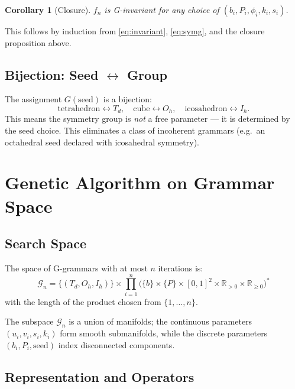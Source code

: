 \documentclass[11pt, a4paper]{article}
\newtheorem{corollary}{Corollary}[section]
\newcommand{\R}{\mathbb{R}}
\newcommand{\Td}{T_d}
\newcommand{\Oh}{O_h}
\newcommand{\Ih}{I_h}
\begin{document}
\begin{corollary}[Closure]
$f_n$ is G-invariant for any choice of $(b_i, P_i, \phi_i, k_i, s_i)$.
\end{corollary}
This follows by induction from \cref{eq:invariant}, \cref{eq:symg}, and the
closure proposition above.

\subsection{Bijection: Seed \texorpdfstring{$\leftrightarrow$}{<->} Group}

The assignment $G(\mathrm{seed})$ is a bijection:
\begin{equation}
  \mathrm{tetrahedron} \leftrightarrow \Td, \quad
  \mathrm{cube} \leftrightarrow \Oh, \quad
  \mathrm{icosahedron} \leftrightarrow \Ih.
\end{equation}
This means the symmetry group is \emph{not} a free parameter — it is
determined by the seed choice. This eliminates a class of incoherent grammars
(e.g.\ an octahedral seed declared with icosahedral symmetry).

\section{Genetic Algorithm on Grammar Space}
\label{sec:ga}

\subsection{Search Space}

The space of G-grammars with at most $n$ iterations is:
\begin{equation}
  \mathcal{G}_n = \{(\Td, \Oh, \Ih)\} \times \prod_{i=1}^{n}
    \bigl(\{b\} \times \{P\} \times [0,1]^2 \times \R_{>0} \times \R_{\geq 0}\bigr)^*
\end{equation}
with the length of the product chosen from $\{1, \ldots, n\}$.

The subspace $\mathcal{G}_n$ is a union of manifolds; the continuous parameters
$(u_i, v_i, s_i, k_i)$ form smooth submanifolds, while the discrete
parameters $(b_i, P_i, \mathrm{seed})$ index disconnected components.

\subsection{Representation and Operators}
\end{document}
